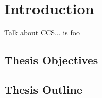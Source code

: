 \chapter{Introduction}

Talk about CCS... \cite{klaim} is foo 

\cite{reactive} 

\section{Thesis Objectives}


\section{Thesis Outline}
